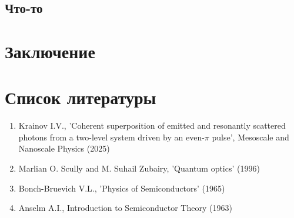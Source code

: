 \documentclass[11pt]{article}    %
\begin{document}
\subsection{Что-то}

\par
\par

\section{Заключение}
\par

\section{Список литературы}

   \begin{enumerate}
       \item Krainov I.V., 'Coherent superposition of emitted and resonantly scattered photons from a two-level system driven by an even-$\pi$ pulse', Mesoscale and Nanoscale Physics (2025)
       \item Marlian O. Scully and M. Suhail Zubairy, 'Quantum optics' (1996)
       \item Bonch-Bruevich V.L., 'Physics of Semiconductors' (1965)
       \item Anselm A.I., Introduction to Semiconductor Theory (1963)
   \end{enumerate}
\end{document}
